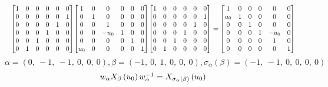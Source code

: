 \documentclass[11pt]{article}
\theoremstyle{definition}
\begin{document}
\[
\scaletoalign{\textwidth}{{\left[\begin{matrix}1 & 0 & 0 & 0 & 0 & 0\\0 & 0 & 0 & 0 & 0 & 1\\0 & 0 & 0 & 0 & 1 & 0\\0 & 0 & 0 & 1 & 0 & 0\\0 & 0 & 1 & 0 & 0 & 0\\0 & 1 & 0 & 0 & 0 & 0\end{matrix}\right]} {\left[\begin{matrix}1 & 0 & 0 & 0 & 0 & 0\\0 & 1 & 0 & 0 & 0 & 0\\0 & 0 & 1 & 0 & 0 & 0\\0 & 0 & - u_{0} & 1 & 0 & 0\\0 & 0 & 0 & 0 & 1 & 0\\u_{0} & 0 & 0 & 0 & 0 & 1\end{matrix}\right]} {\left[\begin{matrix}1 & 0 & 0 & 0 & 0 & 0\\0 & 0 & 0 & 0 & 0 & 1\\0 & 0 & 0 & 0 & 1 & 0\\0 & 0 & 0 & 1 & 0 & 0\\0 & 0 & 1 & 0 & 0 & 0\\0 & 1 & 0 & 0 & 0 & 0\end{matrix}\right]} = {\left[\begin{matrix}1 & 0 & 0 & 0 & 0 & 0\\u_{0} & 1 & 0 & 0 & 0 & 0\\0 & 0 & 1 & 0 & 0 & 0\\0 & 0 & 0 & 1 & - u_{0} & 0\\0 & 0 & 0 & 0 & 1 & 0\\0 & 0 & 0 & 0 & 0 & 1\end{matrix}\right]}}
\]
\[
\alpha = \left( 0, \  -1, \  -1, \  0, \  0, \  0\right), \beta = \left( -1, \  0, \  1, \  0, \  0, \  0\right), \sigma_{\alpha}(\beta) = \left( -1, \  -1, \  0, \  0, \  0, \  0\right)
\]
\[
\scaletoalign{\textwidth}{w_{\alpha} X_{\beta}\left(u_{0}\right) w_{\alpha}^{-1} = X_{\sigma_{\alpha}\left(\beta\right)}\left(u_{0}\right)}
\]
\end{document}
